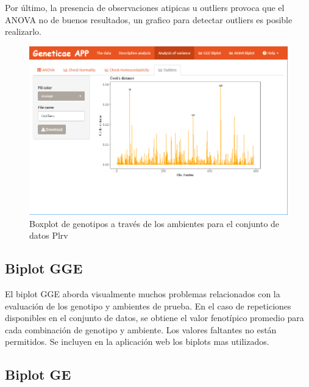 Por último, la presencia de observaciones atipicas u outliers provoca que el ANOVA no de buenos resultados, un grafico para detectar outliers es posible realizarlo.

\begin{figure}[H]
	\begin{center}
		\includegraphics[width=17cm]{./Graficos/Outliers.png}
	\end{center}
	\caption{Boxplot de genotipos a través de los ambientes para el conjunto de datos Plrv}
	\label{fig:fig49}
\end{figure}

\subsection{Biplot GGE}
El biplot GGE aborda visualmente muchos problemas relacionados con la evaluación de los genotipo y ambientes de prueba. En el caso de repeticiones disponibles en el conjunto de datos, se obtiene el valor fenotípico promedio para cada combinación de genotipo y ambiente. Los valores faltantes no están permitidos. Se incluyen en la aplicación web los biplots mas utilizados.


\subsection{Biplot GE}

